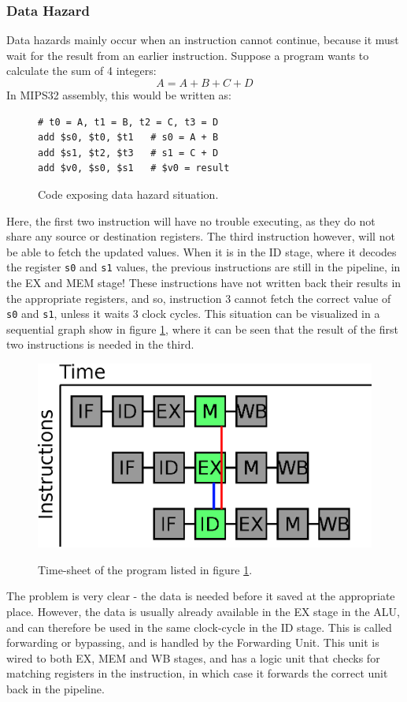 \subsubsection{Data Hazard}
Data hazards mainly occur when an instruction cannot continue, because it must
wait for the result from an earlier instruction. Suppose a program wants to
calculate the sum of 4 integers:
$$A = A + B + C + D$$
In MIPS32 assembly, this would be written as:
\begin{figure}[H]
	\centering
	\begin{lstlisting}
# t0 = A, t1 = B, t2 = C, t3 = D
add $s0, $t0, $t1 	# s0 = A + B
add $s1, $t2, $t3	# s1 = C + D
add $v0, $s0, $s1	# $v0 = result
	\end{lstlisting}
	\caption{Code exposing data hazard situation.}
	\label{fig:data_hazard_code}
\end{figure}
Here, the first two instruction will have no trouble executing, as they do not
share any source or destination registers. The third instruction however, will
not be able to fetch the updated values. When it is in the ID stage, where it decodes the
register \texttt{s0} and \texttt{s1} values, the previous instructions are
still in the pipeline, in the EX and MEM stage! These instructions have not
written back their results in the appropriate registers, and so, instruction 3
cannot fetch the correct value of \texttt{s0} and \texttt{s1}, unless it waits 3 clock
cycles. This situation can be visualized in a sequential graph show in figure
\ref{fig:data_hazard_code}, where it can be seen that the result of the first
two instructions is needed in the third.\\
\begin{figure}[H]
	\centering
	\includegraphics[scale=0.4]{pipeline/data_hazard.eps}
	\label{fig:data_hazard}
	\caption{Time-sheet of the program listed in figure
\ref{fig:data_hazard_code}.}
\end{figure}
The problem is very clear - the data is needed before it saved at the
appropriate place. However, the data is usually already available in the EX
stage in the ALU, and can therefore be used in the same clock-cycle in the ID
stage. This is called forwarding or bypassing, and is handled by the
Forwarding Unit. This unit is wired to both EX, MEM and WB stages, and has a
logic unit that checks for matching registers in the instruction, in which case
it forwards the correct unit back in the pipeline.

